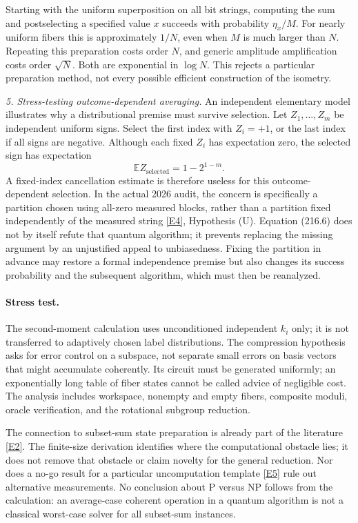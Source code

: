 \documentclass[11pt,a4paper]{article}
\newcommand{\E}{\mathbb{E}}
\newcommand{\eref}[2]{\hyperlink{extra:#1:#2}{[E#2]}}
\begin{document}
Starting with the uniform superposition on all bit strings, computing
the sum and postselecting a specified value $x$ succeeds with probability
$\eta_x/M$. For nearly uniform fibers this is approximately $1/N$, even
when $M$ is much larger than $N$. Repeating this preparation costs order
$N$, and generic amplitude amplification costs order $\sqrt N$.
Both are exponential in $\log N$. This rejects a particular preparation
method, not every possible efficient construction of the isometry.

\textit{5. Stress-testing outcome-dependent averaging.}
An independent elementary model illustrates why a distributional premise
must survive selection. Let $Z_1,\ldots,Z_m$ be independent uniform signs.
Select the first index with $Z_i=+1$, or the last index if all signs are
negative. Although each fixed $Z_i$ has expectation zero, the selected
sign has expectation
\[
 \E Z_{\mathrm{selected}}=1-2^{1-m}.                       \tag{216.6}
\]
A fixed-index cancellation estimate is therefore useless for this
outcome-dependent selection. In the actual 2026 audit, the concern is
specifically a partition chosen using all-zero measured blocks, rather
than a partition fixed independently of the measured string
\eref{statement}{4}, Hypothesis (U). Equation (216.6) does not by itself refute
that quantum algorithm; it prevents replacing the missing argument by an
unjustified appeal to unbiasedness. Fixing the partition in advance may
restore a formal independence premise but also changes its success
probability and the subsequent algorithm, which must then be reanalyzed.

\paragraph{Stress test.}
The second-moment calculation uses unconditioned independent $k_i$ only;
it is not transferred to adaptively chosen label distributions. The
compression hypothesis asks for error control on a subspace, not separate
small errors on basis vectors that might accumulate coherently. Its circuit
must be generated uniformly; an exponentially long table of fiber states
cannot be called advice of negligible cost. The analysis includes workspace,
nonempty and empty fibers, composite moduli, oracle verification, and the
rotational subgroup reduction.

The connection to subset-sum state preparation is already part of the
literature \eref{statement}{2}. The finite-size derivation identifies where the
computational obstacle lies; it does not remove that obstacle or claim
novelty for the general reduction. Nor does a no-go result for a particular
uncomputation template \eref{statement}{5} rule out alternative measurements.
No conclusion about $\mathrm P$ versus $\mathrm{NP}$ follows from the
calculation: an average-case coherent operation in a quantum algorithm is
not a classical worst-case solver for all subset-sum instances.
\end{document}
